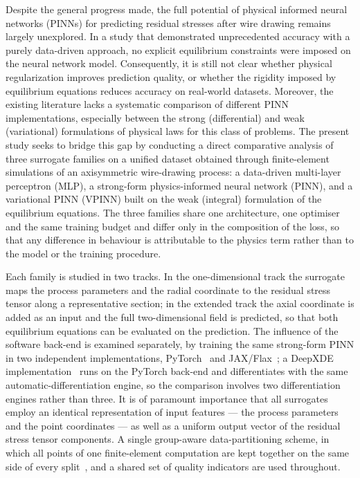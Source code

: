 \documentclass[subscriptcorrection,upint,varvw,barcolor=Goldenrod3,mathalfa=cal=euler,balance,hyphenate,french,pdf-a]{asmejour} %
\begin{document}
Despite the general progress made, the full potential of physical informed neural networks (PINNs) for predicting residual stresses after wire drawing remains largely unexplored. In a study \citep{demin2025forecasting} that demonstrated unprecedented accuracy with a purely data-driven approach, no explicit equilibrium constraints were imposed on the neural network model. Consequently, it is still not clear whether physical regularization improves prediction quality, or whether the rigidity imposed by equilibrium equations reduces accuracy on real-world datasets. Moreover, the existing literature lacks a systematic comparison of different PINN implementations, especially between the strong (differential) and weak (variational) formulations of physical laws for this class of problems.
The present study seeks to bridge this gap by conducting a direct comparative analysis of three surrogate families on a unified dataset obtained through finite-element simulations of an axisymmetric wire-drawing process: a data-driven multi-layer perceptron (MLP), a strong-form physics-informed neural network (PINN), and a variational PINN (VPINN) built on the weak (integral) formulation of the equilibrium equations. The three families share one architecture, one optimiser and the same training budget and differ only in the composition of the loss, so that any difference in behaviour is attributable to the physics term rather than to the model or the training procedure.

Each family is studied in two tracks. In the one-dimensional track the surrogate maps the process parameters and the radial coordinate to the residual stress tensor along a representative section; in the extended track the axial coordinate is added as an input and the full two-dimensional field is predicted, so that both equilibrium equations can be evaluated on the prediction. The influence of the software back-end is examined separately, by training the same strong-form PINN in two independent implementations, PyTorch~\citep{paszke2019pytorch} and JAX/Flax~\citep{bradbury2018jax}; a DeepXDE implementation~\citep{lu2021} runs on the PyTorch back-end and differentiates with the same automatic-differentiation engine, so the comparison involves two differentiation engines rather than three.
It is of paramount importance that all surrogates employ an identical representation of input features --- the process parameters and the point coordinates --- as well as a uniform output vector of the residual stress tensor components. A single group-aware data-partitioning scheme, in which all points of one finite-element computation are kept together on the same side of every split~\citep{roberts2017crossvalidation}, and a shared set of quality indicators are used throughout.
\end{document}
